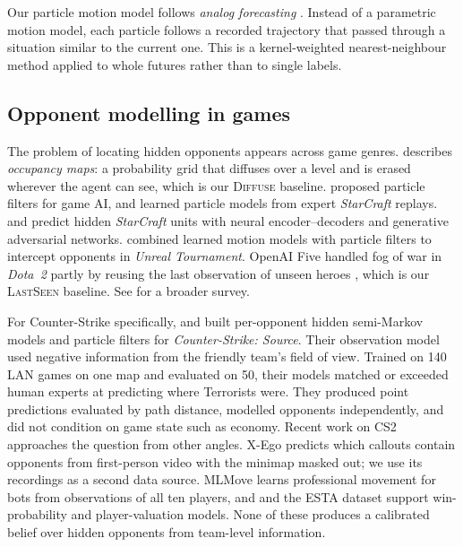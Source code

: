 \documentclass[11pt]{article}
\newcommand{\model}[1]{\textsc{#1}}
\newcommand{\1}{\mathbb{1}}
\begin{document}
Our particle motion model follows \emph{analog forecasting} \citep{lorenz1969atmospheric}. Instead of a parametric motion model, each particle follows a recorded trajectory that passed through a situation similar to the current one. This is a kernel-weighted nearest-neighbour method \citep{cover1967nearest} applied to whole futures rather than to single labels.

\subsection{Opponent modelling in games}
The problem of locating hidden opponents appears across game genres. \citet{isla2006probabilistic} describes \emph{occupancy maps}: a probability grid that diffuses over a level and is erased wherever the agent can see, which is our \model{Diffuse} baseline. \citet{bererton2004state} proposed particle filters for game AI, and \citet{weber2011particle} learned particle models from expert \emph{StarCraft} replays. \citet{synnaeve2018forward} and \citet{jeong2020defoggan} predict hidden \emph{StarCraft} units with neural encoder--decoders and generative adversarial networks. \citet{tastan2012learning} combined learned motion models with particle filters to intercept opponents in \emph{Unreal Tournament}. OpenAI Five handled fog of war in \emph{Dota~2} partly by reusing the last observation of unseen heroes \citep{berner2019dota}, which is our \model{LastSeen} baseline. See \citet{yannakakis2018artificial} for a broader survey.

For Counter-Strike specifically, \citet{hladky2008evaluation} and \citet{hladky2009predicting} built per-opponent hidden semi-Markov models and particle filters for \emph{Counter-Strike: Source}. Their observation model used negative information from the friendly team's field of view. Trained on 140 LAN games on one map and evaluated on 50, their models matched or exceeded human experts at predicting where Terrorists were. They produced point predictions evaluated by path distance, modelled opponents independently, and did not condition on game state such as economy. Recent work on CS2 approaches the question from other angles. X-Ego \citep{wang2025xego} predicts which callouts contain opponents from first-person video with the minimap masked out; we use its recordings as a second data source. MLMove \citep{durst2024learning} learns professional movement for bots from observations of all ten players, and \citet{xenopoulos2020valuing} and the ESTA dataset \citep{xenopoulos2022esta} support win-probability and player-valuation models. None of these produces a calibrated belief over hidden opponents from team-level information.
\end{document}
